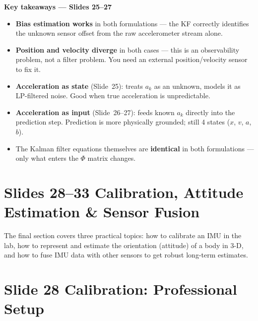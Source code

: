 \documentclass[12pt, a4paper]{article}
\begin{document}
\begin{keybox}
  \textbf{Key takeaways --- Slides 25--27}
  \begin{itemize}[leftmargin=1.4em, topsep=2pt]
    \item \textbf{Bias estimation works} in both formulations ---
          the KF correctly identifies the unknown sensor offset from
          the raw accelerometer stream alone.
    \item \textbf{Position and velocity diverge} in both cases ---
          this is an observability problem, not a filter problem.
          You need an external position/velocity sensor to fix it.
    \item \textbf{Acceleration as state} (Slide~25): treats $a_k$
          as an unknown, models it as LP-filtered noise.
          Good when true acceleration is unpredictable.
    \item \textbf{Acceleration as input} (Slide~26--27): feeds
          known $a_k$ directly into the prediction step.
          Prediction is more physically grounded; still 4 states
          ($x$, $v$, $a$, $b$).
    \item The Kalman filter equations themselves are \textbf{identical}
          in both formulations --- only what enters the $\Phi$ matrix
          changes.
  \end{itemize}
\end{keybox}

\clearpage
\section*{Slides 28--33 \quad Calibration, Attitude Estimation \& Sensor Fusion}

The final section covers three practical topics: how to calibrate an
IMU in the lab, how to represent and estimate the orientation
(attitude) of a body in 3-D, and how to fuse IMU data with other
sensors to get robust long-term estimates.

\section*{Slide 28 \quad Calibration: Professional Setup}
\end{document}
